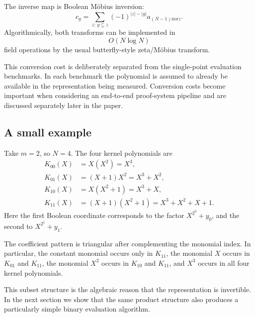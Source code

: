 The inverse map is Boolean Möbius inversion:
\[
c_y
=
\sum_{z:\,y\subseteq z}
(-1)^{|z|-|y|}
a_{(N-1)\mathbin{\mathrm{xor}} z}.
\]
Algorithmically, both transforms can be implemented in
\[
O(N\log N)
\]
field operations by the usual butterfly-style zeta/Möbius transform.

This conversion cost is deliberately separated from the single-point
evaluation benchmarks.  In each benchmark the polynomial is assumed to
already be available in the representation being measured.  Conversion
costs become important when considering an end-to-end proof-system
pipeline and are discussed separately later in the paper.

\subsection{A small example}

Take \(m=2\), so \(N=4\).  The four kernel polynomials are
\[
\begin{aligned}
K_{00}(X)&=X(X^2)=X^3,\\
K_{01}(X)&=(X+1)X^2=X^3+X^2,\\
K_{10}(X)&=X(X^2+1)=X^3+X,\\
K_{11}(X)&=(X+1)(X^2+1)=X^3+X^2+X+1.
\end{aligned}
\]
Here the first Boolean coordinate corresponds to the factor
\(X^{2^0}+y_0\), and the second to \(X^{2^1}+y_1\).

The coefficient pattern is triangular after complementing the monomial
index.  In particular, the constant monomial occurs only in \(K_{11}\),
the monomial \(X\) occurs in \(K_{01}\) and \(K_{11}\), the monomial
\(X^2\) occurs in \(K_{10}\) and \(K_{11}\), and \(X^3\) occurs in all
four kernel polynomials.

This subset structure is the algebraic reason that the representation is
invertible.  In the next section we show that the same product structure
also produces a particularly simple binary evaluation algorithm.
